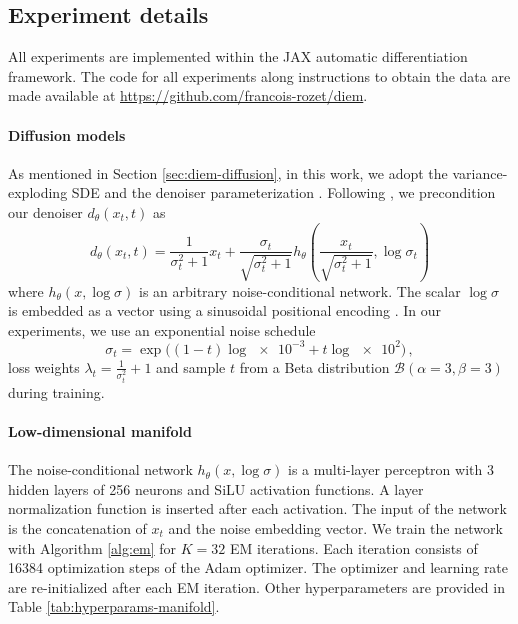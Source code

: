 \begin{subappendices}
\newpage
\section{Experiment details} \label{app:diem-details}

All experiments are implemented within the JAX \cite{bradbury2018jax} automatic differentiation framework. The code for all experiments along instructions to obtain the data are made available at \url{https://github.com/francois-rozet/diem}.

\paragraph{Diffusion models} As mentioned in Section \ref{sec:diem-diffusion}, in this work, we adopt the variance-exploding SDE \cite{song2019generative} and the denoiser parameterization \cite{karras2022elucidating}. Following \textcite{karras2022elucidating}, we precondition our denoiser $d_\theta(x_t, t)$ as
\begin{equation}
    d_\theta(x_t, t) = \frac{1}{\sigma_t^2 + 1} x_t + \frac{\sigma_t}{\sqrt{\sigma_t^2 + 1}} h_\theta \left( \frac{x_t}{\sqrt{\sigma_t^2 + 1}}, \log \sigma_t \right)
\end{equation}
where $h_\theta(x, \log \sigma)$ is an arbitrary noise-conditional network. The scalar $\log \sigma$ is embedded as a vector using a sinusoidal positional encoding \cite{vaswani2017attention}. In our experiments, we use an exponential noise schedule
\begin{equation}
    \sigma_t = \exp \big( (1 - t) \log \num{e-3} + t \log \num{e2} \big) \, ,
\end{equation}
loss weights $\lambda_t = \frac{1}{\sigma_t^2} + 1$ and sample $t$ from a Beta distribution $\mathcal{B}(\alpha=3, \beta=3)$ during training.

\paragraph{Low-dimensional manifold} The noise-conditional network $h_\theta(x, \log \sigma)$ is a multi-layer perceptron with 3 hidden layers of 256 neurons and SiLU \cite{elfwing2018sigmoidweighted} activation functions. A layer normalization \cite{ba2016layer} function is inserted after each activation. The input of the network is the concatenation of $x_t$ and the noise embedding vector. We train the network with Algorithm \ref{alg:em} for $K = 32$ EM iterations. Each iteration consists of \num{16384} optimization steps of the Adam \cite{kingma2015adam} optimizer. The optimizer and learning rate are re-initialized after each EM iteration. Other hyperparameters are provided in Table \ref{tab:hyperparams-manifold}.


\end{subappendices}

